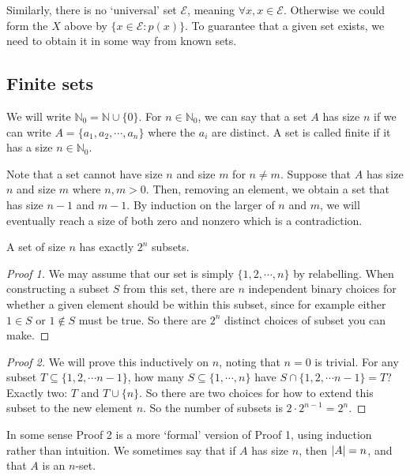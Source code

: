 Similarly, there is no `universal' set \(\mathscr E\), meaning \(\forall x, x \in \mathscr E\).
Otherwise we could form the \(X\) above by \(\{ x \in \mathscr E: p(x) \}\).
To guarantee that a given set exists, we need to obtain it in some way from known sets.

\subsection{Finite sets}
We will write \(\mathbb N_0 = \mathbb N \cup \{ 0 \}\).
For \(n \in \mathbb N_0\), we can say that a set \(A\) has size \(n\) if we can write \(A = \{ a_1, a_2, \cdots, a_n \}\) where the \(a_i\) are distinct.
A set is called finite if it has a size \(n \in \mathbb N_0\).

Note that a set cannot have size \(n\) and size \(m\) for \(n \neq m\).
Suppose that \(A\) has size \(n\) and size \(m\) where \(n, m > 0\).
Then, removing an element, we obtain a set that has size \(n-1\) and \(m-1\).
By induction on the larger of \(n\) and \(m\), we will eventually reach a size of both zero and nonzero which is a contradiction.

\begin{proposition}
	A set of size \(n\) has exactly \(2^n\) subsets.
\end{proposition}
\begin{proof}[Proof 1]
	We may assume that our set is simply \(\{ 1, 2, \cdots, n \}\) by relabelling.
	When constructing a subset \(S\) from this set, there are \(n\) independent binary choices for whether a given element should be within this subset, since for example either \(1 \in S\) or \(1 \notin S\) must be true.
	So there are \(2^n\) distinct choices of subset you can make.
\end{proof}
\begin{proof}[Proof 2]
	We will prove this inductively on \(n\), noting that \(n=0\) is trivial.
	For any subset \(T \subseteq \{ 1, 2, \cdots n-1 \}\), how many \(S \subseteq \{ 1, \cdots, n \}\) have \(S \cap \{ 1, 2, \cdots n-1 \} = T\)?
	Exactly two: \(T\) and \(T \cup \{ n \}\).
	So there are two choices for how to extend this subset to the new element \(n\).
	So the number of subsets is \(2 \cdot 2^{n-1} = 2^n\).
\end{proof}
\noindent In some sense Proof 2 is a more `formal' version of Proof 1, using induction rather than intuition.
We sometimes say that if \(A\) has size \(n\), then \(\abs{A} = n\), and that \(A\) is an \(n\)-set.

